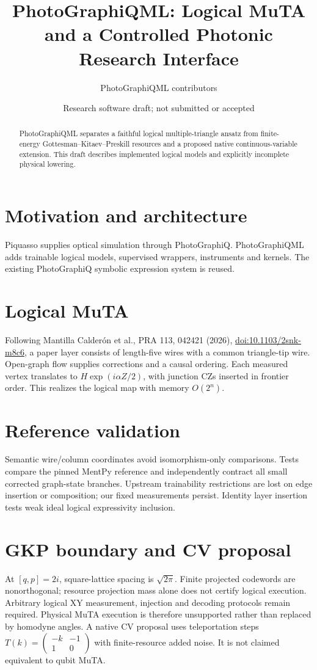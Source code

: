 \documentclass{article}
\title{PhotoGraphiQML: Logical MuTA and a Controlled Photonic Research Interface}
\author{PhotoGraphiQML contributors}
\date{Research software draft; not submitted or accepted}
\begin{document}
\maketitle
\begin{abstract}
PhotoGraphiQML separates a faithful logical multiple-triangle ansatz from
finite-energy Gottesman--Kitaev--Preskill resources and a proposed native
continuous-variable extension. This draft describes implemented logical
models and explicitly incomplete physical lowering.
\end{abstract}
\section{Motivation and architecture}
Piquasso supplies optical simulation through PhotoGraphiQ. PhotoGraphiQML
adds trainable logical models, supervised wrappers, instruments and kernels.
The existing PhotoGraphiQ symbolic expression system is reused.
\section{Logical MuTA}
Following Mantilla Calder\'on et al., PRA 113, 042421 (2026),
\href{https://doi.org/10.1103/2snk-m8c6}{doi:10.1103/2snk-m8c6},
a paper layer consists of length-five wires with a common triangle-tip wire.
Open-graph flow supplies corrections and a causal ordering. Each measured
vertex translates to $H\exp(i\alpha Z/2)$, with junction CZs inserted in
frontier order. This realizes the logical map with memory $O(2^n)$.
\section{Reference validation}
Semantic wire/column coordinates avoid isomorphism-only comparisons.
Tests compare the pinned MentPy reference and independently contract all
small corrected graph-state branches. Upstream trainability restrictions
are lost on edge insertion or composition; our fixed measurements persist.
Identity layer insertion tests weak ideal logical expressivity inclusion.
\section{GKP boundary and CV proposal}
At $[q,p]=2i$, square-lattice spacing is $\sqrt{2\pi}$.
Finite projected codewords are nonorthogonal; resource projection mass alone
does not certify logical execution. Arbitrary logical XY measurement,
injection and decoding protocols remain required. Physical MuTA execution
is therefore unsupported rather than replaced by homodyne angles.
A native CV proposal uses teleportation steps
$T(k)=\left(\begin{smallmatrix}-k&-1\\1&0\end{smallmatrix}\right)$
with finite-resource added noise. It is not claimed equivalent to qubit MuTA.
\end{document}
